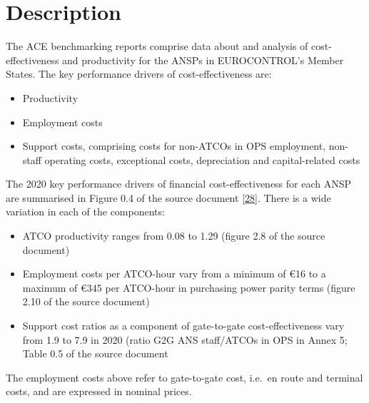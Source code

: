 \documentclass[
  11pt,
  a4paper,
]{book}
\begin{document}
\hypertarget{description-5}{%
\section{Description}\label{description-5}}

The ACE benchmarking reports comprise data about and analysis of
cost-effectiveness and productivity for the ANSPs in EUROCONTROL's
Member States. The key performance drivers of cost-effectiveness are:

\begin{itemize}
\item
  Productivity
\item
  Employment costs
\item
  Support costs, comprising costs for non-ATCOs in OPS employment,
  non-staff operating costs, exceptional costs, depreciation and
  capital-related costs
\end{itemize}

The 2020 key performance drivers of financial cost-effectiveness for
each ANSP are summarised in Figure 0.4 of the source document
\protect\hyperlink{ref-ace2020}{{[}28{]}}. There is a wide variation in
each of the components:

\begin{itemize}
\item
  ATCO productivity ranges from 0.08 to 1.29 (figure 2.8 of the source
  document)
\item
  Employment costs per ATCO-hour vary from a minimum of €16 to a maximum
  of €345 per ATCO-hour in purchasing power parity terms (figure 2.10 of
  the source document)
\item
  Support cost ratios as a component of gate-to-gate cost-effectiveness
  vary from 1.9 to 7.9 in 2020 (ratio G2G ANS staff/ATCOs in OPS in
  Annex 5; Table 0.5 of the source document
\end{itemize}

\begin{tcolorbox}[enhanced jigsaw, colframe=quarto-callout-note-color-frame, colback=white, toptitle=1mm, coltitle=black, leftrule=.75mm, title=\textcolor{quarto-callout-note-color}{\faInfo}\hspace{0.5em}{Note}, left=2mm, rightrule=.15mm, bottomtitle=1mm, breakable, titlerule=0mm, arc=.35mm, colbacktitle=quarto-callout-note-color!10!white, bottomrule=.15mm, opacityback=0, opacitybacktitle=0.6, toprule=.15mm]

The employment costs above refer to gate-to-gate cost, i.e.~en route and
terminal costs, and are expressed in nominal prices.

\end{tcolorbox}
\end{document}
